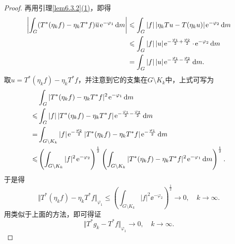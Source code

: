 \begin{proof}
再用引理\ref{lem6.3.2}\hyperlink{6.3.2}{(1)}，即得
\begin{align*}
	\left|\int_G (T^\ast(\eta_k f)-\eta_k T^\ast f)\bar{u}\ee^{-\varphi_1}\dif m\right|
	&\le\int_G |f|\,|\eta_k Tu-T(\eta_k u)|\ee^{-\varphi_2}\dif m\\
	&\le\int_G |f|\,|u|\ee^{-\frac{\varphi_1}{2}+\frac{\varphi_2}{2}}\cdot\ee^{-\varphi_2}\dif m\\
	&=\int_G |f|\,|u|\ee^{-\frac{\varphi_1}{2}-\frac{\varphi_2}{2}}\dif m.
\end{align*}
取$u=T^\ast(\eta_k f)-\eta_k T^\ast f$，并注意到它的支集在$G\setminus K_k$中，上式可写为
\begin{align*}
	&\int_G|T^\ast(\eta_k f)-\eta_k T^\ast f|^2\ee^{-\varphi_1}\dif m\\
	\le&\int_G |f|\,|T^\ast(\eta_k f)-\eta_k T^\ast f|\ee^{-\frac{\varphi_1}{2}-\frac{\varphi_2}{2}}\dif m\\
	=&\int_{G\setminus K_k}|f|\ee^{-\frac{\varphi_2}{2}}|T^\ast(\eta_k f)-\eta_k T^\ast f|\ee^{-\frac{\varphi_1}{2}}\dif m\\
	\le&\left(\int_{G\setminus K_k}|f|^2\ee^{-\varphi_2}\right)^{\frac12}\left(\int_{G\setminus K_k}|T^\ast(\eta_k f)-\eta_k T^\ast f|^2\ee^{-\varphi_1}\dif m\right)^{\frac12}.
\end{align*}
于是得
\[\Vert T^\ast(\eta_k f)-\eta_k T^\ast f\Vert_{\varphi_1}\le\left(\int_{G\setminus K_k}|f|^2\ee^{-\varphi_2}\right)^{\frac12}\to0,\quad k\to\infty.\]
用类似于上面的方法，即可得证
\[\Vert T^\ast g_k-T^\ast f\Vert_{\varphi_1}\to0,\quad k\to\infty.\]
	

\end{proof}
